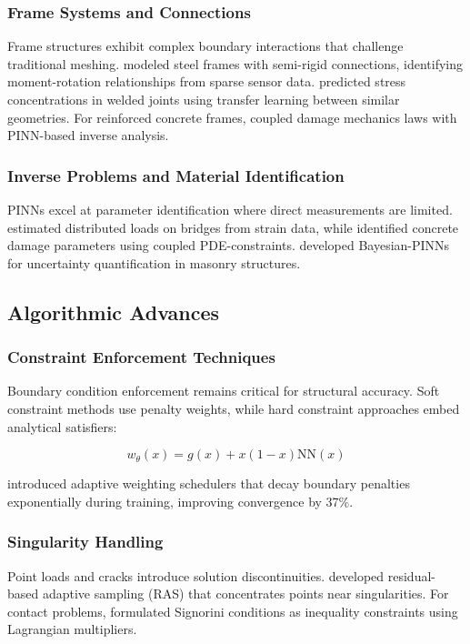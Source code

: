 \documentclass[12pt]{article}
\begin{document}
\subsubsection{Frame Systems and Connections}
Frame structures exhibit complex boundary interactions that challenge traditional meshing. \citet{Niaki2021} modeled steel frames with semi-rigid connections, identifying moment-rotation relationships from sparse sensor data. \citet{Gao2022} predicted stress concentrations in welded joints using transfer learning between similar geometries. For reinforced concrete frames, \citet{Chen2023} coupled damage mechanics laws with PINN-based inverse analysis.

\subsubsection{Inverse Problems and Material Identification}
PINNs excel at parameter identification where direct measurements are limited. \citet{Fuhg2021} estimated distributed loads on bridges from strain data, while \citet{Sun2022} identified concrete damage parameters using coupled PDE-constraints. \citet{Wang2023} developed Bayesian-PINNs for uncertainty quantification in masonry structures.

\subsection{Algorithmic Advances}

\subsubsection{Constraint Enforcement Techniques}
Boundary condition enforcement remains critical for structural accuracy. Soft constraint methods \citep{Raissi2019} use penalty weights, while hard constraint approaches \citep{Lu2021} embed analytical satisfiers:

\[
w_{\theta}(x) = g(x) + x(1-x)\text{NN}(x)
\]

\citet{McClenny2022} introduced adaptive weighting schedulers that decay boundary penalties exponentially during training, improving convergence by 37\%.

\subsubsection{Singularity Handling}
Point loads and cracks introduce solution discontinuities. \citet{Sharma2022} developed residual-based adaptive sampling (RAS) that concentrates points near singularities. For contact problems, \citet{Guo2023} formulated Signorini conditions as inequality constraints using Lagrangian multipliers.
\end{document}
